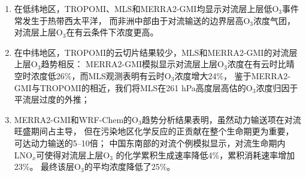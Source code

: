 \begin{enumerate}[label=（\arabic*）, labelindent=\parindent, leftmargin=0pt, widest=0, itemindent=*, topsep=0pt, partopsep=0pt, parsep=0pt]

\item 在低纬地区，TROPOMI、MLS和MERRA2-GMI均显示对流层上层低O$_3$事件常发生于热带西太平洋，
而非洲中部由于对流输送的边界层高O$_3$浓度气团，对流层上层O$_3$在有云条件下浓度更高。

\item 在中纬地区，TROPOMI的云切片结果较少，MLS和MERRA2-GMI的对流层上层O$_3$趋势相反：
MERRA2-GMI模拟显示对流层上层O$_3$浓度在有云时比晴空时浓度低26\%，而MLS观测表明有云时O$_3$浓度增大24\%，
鉴于MERRA2-GMI与TROPOMI的相近，我们将MLS在261 hPa高度层高估的O$_3$浓度归因于平流层过度的外推；



\item MERRA2-GMI和WRF-Chem的O$_3$趋势分析结果表明，虽然动力输送项在对流旺盛期间占主导，
但在污染地区化学反应的正贡献在整个生命期更为重要，可达动力输送的5--10倍；
中国东南部的对流个例模拟显示，对流生命期内LNO$_x$可使得对流层上层O$_3$
的化学累积生成速率降低4\%，累积消耗速率增加23\%。
最终该层O$_3$的平均浓度降低了25\%。

\end{enumerate}
